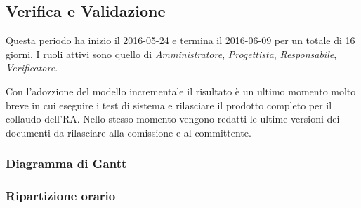 \newpage

\subsection{Verifica e Validazione}
Questa periodo ha inizio il 2016-05-24 e termina il 2016-06-09 per un totale di 16 giorni.
I ruoli attivi sono quello di \textit{Amministratore}, \textit{Progettista}, \textit{Responsabile}, \textit{Verificatore}.

Con l'adozzione del modello incrementale il risultato \`e un ultimo momento molto breve in cui eseguire i test di sistema e rilasciare il prodotto completo per il collaudo dell'RA. Nello stesso momento vengono redatti le ultime versioni dei documenti da rilasciare alla comissione e al committente.

\subsubsection{Diagramma di Gantt}

\subsubsection{Ripartizione orario}

